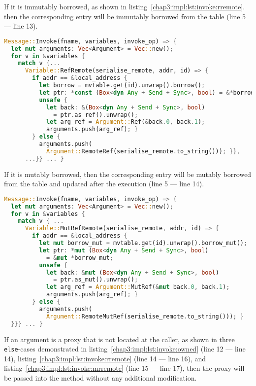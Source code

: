 If it is immutably borrowed, as shown in listing~\ref{chap3:impl:lst:invoke:rremote}. then the corresponding entry will be immutably borrowed from the table (line 5 --- line 13).
\begin{lstlisting}[language=Rust, style=boxed, basicstyle=\footnotesize\ttfamily, caption={Gathering variables from an invocation message: \texttt{RefRemote}}, label=chap3:impl:lst:invoke:rremote]
Message::Invoke(fname, variables, invoke_op) => {
  let mut arguments: Vec<Argument> = Vec::new();
  for v in &variables {
    match v {...
      Variable::RefRemote(serialise_remote, addr, id) => {
        if addr == &local_address {
          let borrow = mvtable.get(id).unwrap().borrow();
          let ptr: *const (Box<dyn Any + Send + Sync>, bool) = &*borrow;
          unsafe {
            let back: &(Box<dyn Any + Send + Sync>, bool) 
              = ptr.as_ref().unwrap();
            let arg_ref = Argument::Ref(&back.0, back.1);
            arguments.push(arg_ref); }
        } else { 
          arguments.push(
            Argument::RemoteRef(serialise_remote.to_string())); }},
      ...}} ... }
\end{lstlisting}

 If it is mutably borrowed, then the corresponding entry will be mutably borrowed from the table and updated after the execution (line 5 --- line 14). 
\begin{lstlisting}[language=Rust, style=boxed, basicstyle=\footnotesize\ttfamily, caption={Gathering variables from an invocation message: \texttt{MutRefRemote}}, label=chap3:impl:lst:invoke:mrremote]
Message::Invoke(fname, variables, invoke_op) => {
  let mut arguments: Vec<Argument> = Vec::new();
  for v in &variables {
    match v { ...
      Variable::MutRefRemote(serialise_remote, addr, id) => {
        if addr == &local_address {
          let mut borrow_mut = mvtable.get(id).unwrap().borrow_mut();
          let ptr: *mut (Box<dyn Any + Send + Sync>, bool)
            = &mut *borrow_mut;
          unsafe {
            let back: &mut (Box<dyn Any + Send + Sync>, bool) 
              = ptr.as_mut().unwrap();
            let arg_ref = Argument::MutRef(&mut back.0, back.1);
            arguments.push(arg_ref); }
        } else { 
          arguments.push(
            Argument::RemoteMutRef(serialise_remote.to_string())); }
  }}} ... }
\end{lstlisting}

If an argument is a proxy that is not located at the caller, as shown in three \texttt{else}-cases demonstrated in listing~\ref{chap3:impl:lst:invoke:owned} (line 12 --- line 14), listing~\ref{chap3:impl:lst:invoke:rremote} (line 14 --- line 16), and listing~\ref{chap3:impl:lst:invoke:mrremote} (line 15 --- line 17), then the proxy will be passed into the method without any additional modification.

